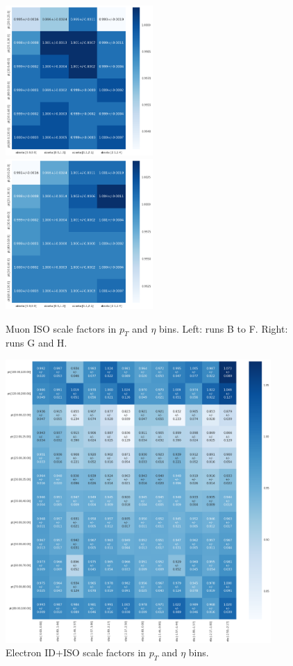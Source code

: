 \begin{figure}
\centering
\includegraphics[width=0.5\textwidth]{figures/muon_ISO_BCDEFv2.png}
\bigbreak
\includegraphics[width=0.5\textwidth]{figures/muon_ISO_GHv2.png}
\caption{ Muon ISO scale factors in $p_{T}$ and $\eta$ bins. Left: runs B to F. Right: runs G and H.}
\label{fig:muonISO_SF}
\end{figure}

\newline
\newline

\begin{figure}
\centering
\includegraphics[width=0.9\textwidth]{figures/EIDISO_ZH_out.png}
\caption{ Electron ID+ISO scale factors in $p_{T}$ and $\eta$ bins.}
\label{fig:muonID_SF}
\end{figure}

